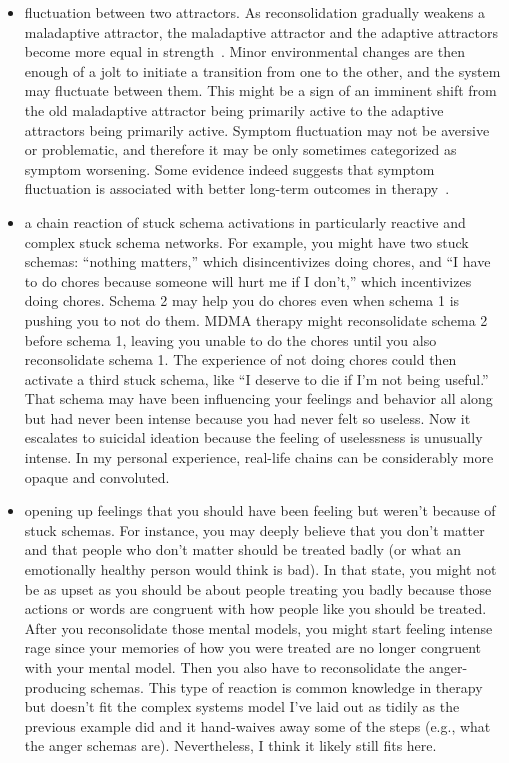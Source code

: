 \documentclass[11pt,oneside]{book}
\let\cite\parencite
\begin{document}
\begin{itemize}
    \item fluctuation between two attractors. As reconsolidation gradually weakens a maladaptive attractor, the maladaptive attractor and the adaptive attractors become more equal in strength~\cite{hayes2020complex}. Minor environmental changes are then enough of a jolt to initiate a transition from one to the other, and the system may fluctuate between them. This might be a sign of an imminent shift from the old maladaptive attractor being primarily active to the adaptive attractors being primarily active. Symptom fluctuation may not be aversive or problematic, and therefore it may be only sometimes categorized as symptom worsening. Some evidence indeed suggests that symptom fluctuation is associated with better long-term outcomes in therapy~\cite{olthofDestabilization}.
    \item a chain reaction of stuck schema activations in particularly reactive and complex stuck schema networks. For example, you might have two stuck schemas: \enquote{nothing matters,} which disincentivizes doing chores, and \enquote{I have to do chores because someone will hurt me if I don't,} which incentivizes doing chores. Schema 2 may help you do chores even when schema 1 is pushing you to not do them. MDMA therapy might reconsolidate schema 2 before schema 1, leaving you unable to do the chores until you also reconsolidate schema 1. The experience of not doing chores could then activate a third stuck schema, like \enquote{I deserve to die if I'm not being useful.} That schema may have been influencing your feelings and behavior all along but had never been intense because you had never felt so useless. Now it escalates to suicidal ideation because the feeling of uselessness is unusually intense. In my personal experience, real-life chains can be considerably more opaque and convoluted.
    \item opening up feelings that you should have been feeling but weren't because of stuck schemas. For instance, you may deeply believe that you don't matter and that people who don't matter should be treated badly (or what an emotionally healthy person would think is bad). In that state, you might not be as upset as you should be about people treating you badly because those actions or words are congruent with how people like you should be treated. After you reconsolidate those mental models, you might start feeling intense rage since your memories of how you were treated are no longer congruent with your mental model. Then you also have to reconsolidate the anger-producing schemas. This type of reaction is common knowledge in therapy but doesn't fit the complex systems model I've laid out as tidily as the previous example did and it hand-waives away some of the steps (e.g., what the anger schemas are). Nevertheless, I think it likely still fits here.
\end{itemize}
\end{document}
